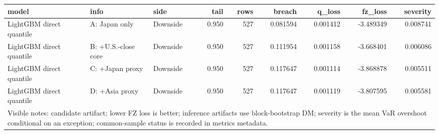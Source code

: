 \begin{tabular}{lllrrrrrr}
\toprule
model & info & side & tail & rows & breach & q_loss & fz_loss & severity \\
\midrule
LightGBM direct quantile & A: Japan only & Downside & 0.950 & 527 & 0.081594 & 0.001412 & -3.489349 & 0.008741 \\
LightGBM direct quantile & B: +U.S.-close core & Downside & 0.950 & 527 & 0.111954 & 0.001158 & -3.668401 & 0.006086 \\
LightGBM direct quantile & C: +Japan proxy & Downside & 0.950 & 527 & 0.117647 & 0.001114 & -3.868878 & 0.005511 \\
LightGBM direct quantile & D: +Asia proxy & Downside & 0.950 & 527 & 0.117647 & 0.001119 & -3.807595 & 0.005581 \\
\midrule
\multicolumn{9}{l}{\footnotesize Visible notes: candidate artifact; lower FZ loss is better; inference artifacts use block-bootstrap DM; severity is the mean VaR overshoot conditional on an exception; common-sample status is recorded in metrics metadata.} \\
\bottomrule
\end{tabular}
